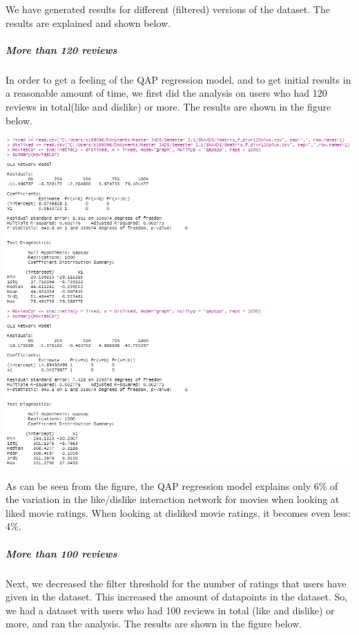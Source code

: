 \documentclass[
  man]{apa6}
\begin{document}
We have generated results for different (filtered) versions of the
dataset. The results are explained and shown below.

\hypertarget{more-than-120-reviews}{%
\subparagraph{More than 120 reviews}\label{more-than-120-reviews}}

In order to get a feeling of the QAP regression model, and to get
initial results in a reasonable amount of time, we first did the
analysis on users who had 120 reviews in total(like and dislike) or
more. The results are shown in the figure below.

\includegraphics[width=11.86in]{results120plus}

As can be seen from the figure, the QAP regression model explains only
6\% of the variation in the like/dislike interaction network for movies
when looking at liked movie ratings. When looking at disliked movie
ratings, it becomes even less: 4\%.

\hypertarget{more-than-100-reviews}{%
\subparagraph{More than 100 reviews}\label{more-than-100-reviews}}

Next, we decreased the filter threshold for the number of ratings that
users have given in the dataset. This increased the amount of datapoints
in the dataset. So, we had a dataset with users who had 100 reviews in
total (like and dislike) or more, and ran the analysis. The results are
shown in the figure below.
\end{document}
